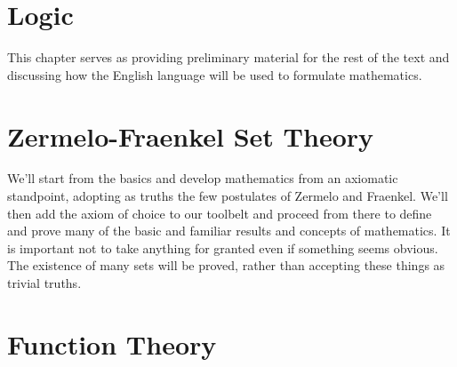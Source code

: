 \begingroup
    \ifcsname\PATH\endcsname
        \newcommand{\PATH}{books/Foundations/ZFC}
        \newcommand{\OLDPATH}{\PATH}
    \else
        \newcommand{\OLDPATH}{\PATH}
        \renewcommand{\PATH}{books/Foundations/ZFC}
    \fi
    \chapter{Logic}
        This chapter serves as providing preliminary material for the rest of
        the text and discussing how the English language will be used to
        formulate mathematics.
        
    \chapter{Zermelo-Fraenkel Set Theory}
        We'll start from the basics and develop mathematics from an axiomatic
        standpoint, adopting as truths the few postulates of Zermelo and
        Fraenkel. We'll then add the axiom of choice to our toolbelt and
        proceed from there to define and prove many of the basic and familiar
        results and concepts of mathematics. It is important not to take
        anything for granted even if something seems obvious. The existence of
        many sets will be proved, rather than accepting these things as trivial
        truths.
        
        
        
    \chapter{Function Theory}
        
        

    \renewcommand{\PATH}{\OLDPATH}
\endgroup